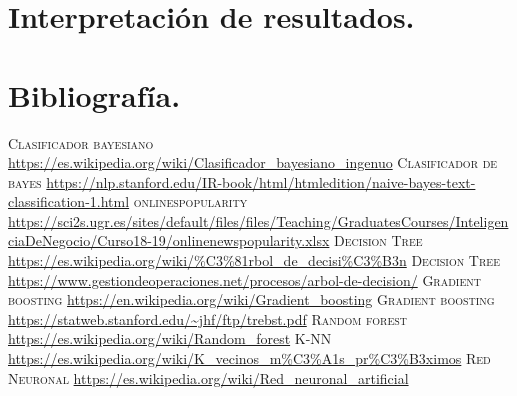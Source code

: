 	\section[Interpretación de resultados]{Interpretación de resultados.} 
	
	\section[Bibliografía]{Bibliografía.}

	

	\begin{thebibliography}{99}
		\textsc{Clasificador bayesiano}
		\newline
		\url{https://es.wikipedia.org/wiki/Clasificador_bayesiano_ingenuo}
		\textsc{Clasificador de bayes}
		\newline
		\url{https://nlp.stanford.edu/IR-book/html/htmledition/naive-bayes-text-classification-1.html}
		\textsc{onlinespopularity}
		\newline
		\url{https://sci2s.ugr.es/sites/default/files/files/Teaching/GraduatesCourses/InteligenciaDeNegocio/Curso18-19/onlinenewspopularity.xlsx}	
		\textsc{Decision Tree}
		\newline
		\url{https://es.wikipedia.org/wiki/%C3%81rbol_de_decisi%C3%B3n}	
		\textsc{Decision Tree}
		\newline
		\url{https://www.gestiondeoperaciones.net/procesos/arbol-de-decision/}	
		\textsc{Gradient boosting}
		\newline
		\url{https://en.wikipedia.org/wiki/Gradient_boosting}
		\textsc{Gradient boosting}
		\newline
		\url{https://statweb.stanford.edu/~jhf/ftp/trebst.pdf}
		\textsc{Random forest}
		\newline
		\url{https://es.wikipedia.org/wiki/Random_forest}
		\textsc{K-NN}
		\newline
		\url{https://es.wikipedia.org/wiki/K_vecinos_m%C3%A1s_pr%C3%B3ximos}
		\textsc{Red Neuronal}
		\newline
		\url{https://es.wikipedia.org/wiki/Red_neuronal_artificial}
	\end{thebibliography}

	


